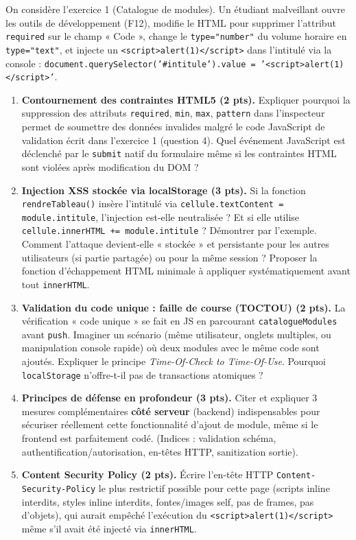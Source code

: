 \documentclass[11pt]{article}
\begin{document}
\begin{exercice}
On considère l'exercice 1 (Catalogue de modules). Un étudiant malveillant ouvre les outils de développement (F12), modifie le HTML pour supprimer l'attribut \texttt{required} sur le champ « Code », change le \texttt{type="number"} du volume horaire en \texttt{type="text"}, et injecte un \texttt{<script>alert(1)</script>} dans l'intitulé via la console : \texttt{document.querySelector('\#intitule').value = '<script>alert(1)</script>'}.

\begin{enumerate}
    \item \textbf{Contournement des contraintes HTML5 (2 pts).} Expliquer pourquoi la suppression des attributs \texttt{required}, \texttt{min}, \texttt{max}, \texttt{pattern} dans l'inspecteur permet de soumettre des données invalides malgré le code JavaScript de validation écrit dans l'exercice 1 (question 4). Quel événement JavaScript est déclenché par le \texttt{submit} natif du formulaire même si les contraintes HTML sont violées après modification du DOM ?
    \item \textbf{Injection XSS stockée via localStorage (3 pts).} Si la fonction \texttt{rendreTableau()} insère l'intitulé via \texttt{cellule.textContent = module.intitule}, l'injection est-elle neutralisée ? Et si elle utilise \texttt{cellule.innerHTML += module.intitule} ? Démontrer par l'exemple. Comment l'attaque devient-elle « stockée » et persistante pour les autres utilisateurs (si partie partagée) ou pour la même session ? Proposer la fonction d'échappement HTML minimale à appliquer systématiquement avant tout \texttt{innerHTML}.
    \item \textbf{Validation du code unique : faille de course (TOCTOU) (2 pts).} La vérification « code unique » se fait en JS en parcourant \texttt{catalogueModules} avant \texttt{push}. Imaginer un scénario (même utilisateur, onglets multiples, ou manipulation console rapide) où deux modules avec le même code sont ajoutés. Expliquer le principe \textit{Time-Of-Check to Time-Of-Use}. Pourquoi \texttt{localStorage} n'offre-t-il pas de transactions atomiques ?
    \item \textbf{Principes de défense en profondeur (3 pts).} Citer et expliquer 3 mesures complémentaires \textbf{côté serveur} (backend) indispensables pour sécuriser réellement cette fonctionnalité d'ajout de module, même si le frontend est parfaitement codé. (Indices : validation schéma, authentification/autorisation, en-têtes HTTP, sanitization sortie).
    \item \textbf{Content Security Policy (2 pts).} Écrire l'en-tête HTTP \texttt{Content-Security-Policy} le plus restrictif possible pour cette page (scripts inline interdits, styles inline interdits, fontes/images self, pas de frames, pas d'objets), qui aurait empêché l'exécution du \texttt{<script>alert(1)</script>} même s'il avait été injecté via \texttt{innerHTML}.
\end{enumerate}
\end{exercice}
\end{document}

